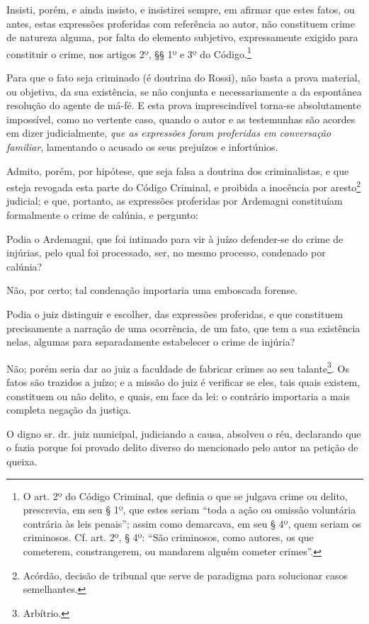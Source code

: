 {Insisti, porém, e ainda insisto, e insistirei sempre, em afirmar que
estes fatos, ou antes, estas expressões proferidas com referência ao
autor, não constituem crime de natureza alguma, por falta do elemento
subjetivo, expressamente exigido para constituir o crime, nos artigos
2º, §§ 1º e 3º do Código.\footnote{ O art. 2º do Código Criminal, que
  definia o que se julgava crime ou delito, prescrevia, em seu § 1º, que
  estes seriam ``toda a ação ou omissão voluntária contrária às leis
  penais''; assim como demarcava, em seu § 4º, quem seriam os criminosos.
  Cf. art. 2º, § 4º: ``São criminosos, como autores, os que cometerem,
  constrangerem, ou mandarem alguém cometer crimes''.}

Para que o fato seja criminado (é doutrina do Rossi), não basta a prova
material, ou objetiva, da sua existência, se não conjunta e
necessariamente a da espontânea resolução do agente de má-fé. E esta
prova imprescindível torna-se absolutamente impossível, como no vertente
caso, quando o autor e as testemunhas são acordes em dizer
judicialmente, \emph{que as expressões foram proferidas em conversação
familiar}, lamentando o acusado os seus prejuízos e infortúnios.

Admito, porém, por hipótese, que seja falsa a doutrina dos
criminalistas, e que esteja revogada esta parte do Código Criminal, e
proibida a inocência por aresto\footnote{ Acórdão, decisão de tribunal
  que serve de paradigma para solucionar casos semelhantes.} judicial; e
que, portanto, as expressões proferidas por Ardemagni constituíam
formalmente o crime de calúnia, e pergunto:

Podia o Ardemagni, que foi intimado para vir à juízo defender-se do
crime de injúrias, pelo qual foi processado, ser, no mesmo processo,
condenado por calúnia?

Não, por certo; tal condenação importaria uma emboscada forense.

Podia o juiz distinguir e escolher, das expressões proferidas, e que
constituem precisamente a narração de uma ocorrência, de um fato, que
tem a sua existência nelas, algumas para separadamente estabelecer o
crime de injúria?

Não; porém seria dar ao juiz a faculdade de fabricar crimes ao seu
talante\footnote{ Arbítrio.}. Os fatos são trazidos a juízo; e a missão
do juiz é verificar se eles, tais quais existem, constituem ou não
delito, e quais, em face da lei: o contrário importaria a mais completa
negação da justiça.

O digno sr. dr. juiz municipal, judiciando a causa, absolveu o réu,
declarando que o fazia porque foi provado delito diverso do mencionado
pelo autor na petição de queixa.

}
